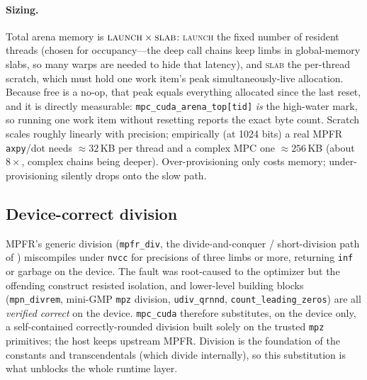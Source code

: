 \documentclass[11pt,a4paper]{article}
\newcommand{\code}[1]{\texttt{#1}}
\begin{document}
\paragraph{Sizing.}
Total arena memory is $\textsc{launch}\times\textsc{slab}$: \textsc{launch} the
fixed number of resident threads (chosen for occupancy---the deep call chains keep
limbs in global-memory slabs, so many warps are needed to hide that latency), and
\textsc{slab} the per-thread scratch, which must hold one work item's peak
simultaneously-live allocation. Because free is a no-op, that peak equals
everything allocated since the last reset, and it is directly measurable:
\code{mpc\_cuda\_arena\_top[tid]} \emph{is} the high-water mark, so running one
work item without resetting reports the exact byte count. Scratch scales roughly
linearly with precision; empirically (at 1024 bits) a real MPFR \code{axpy}/dot
needs $\approx 32$\,KB per thread and a complex MPC one $\approx 256$\,KB (about
$8\times$, complex chains being deeper). Over-provisioning only costs memory;
under-provisioning silently drops onto the slow path.

\subsection{Device-correct division}
\label{sec:div}

MPFR's generic division (\code{mpfr\_div}, the divide-and-conquer / short-division
path of \cite{HarveyZimmermann,MollerGranlund}) miscompiles under \code{nvcc} for
precisions of three limbs or more, returning \code{inf} or garbage on the device.
The fault was root-caused to the optimizer but the offending construct resisted
isolation, and lower-level building blocks (\code{mpn\_divrem}, mini-GMP \code{mpz}
division, \code{udiv\_qrnnd}, \code{count\_leading\_zeros}) are all
\emph{verified correct} on the device. \code{mpc\_cuda} therefore substitutes, on
the device only, a self-contained correctly-rounded division built solely on the
trusted \code{mpz} primitives; the host keeps upstream MPFR. Division is the
foundation of the constants and transcendentals (which divide internally), so this
substitution is what unblocks the whole runtime layer.
\end{document}

